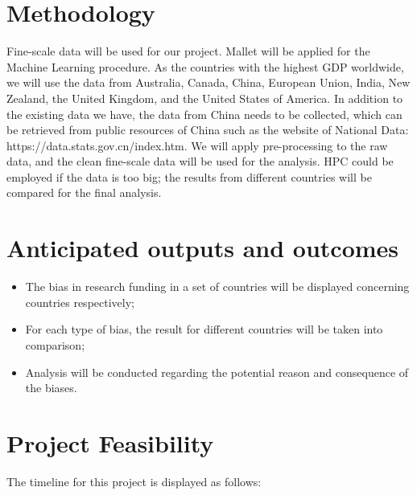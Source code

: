 \documentclass[11pt, oneside]{article}   	%
\begin{document}
\section{Methodology}
Fine-scale data will be used for our project. Mallet will be applied for the Machine Learning procedure. As the countries with the highest GDP worldwide, we will use the data from Australia, Canada, China, European Union, India, New Zealand, the United Kingdom, and the United States of America. In addition to the existing data we have, the data from China needs to be collected, which can be retrieved from public resources of China such as the website of National Data: https://data.stats.gov.cn/index.htm. 
We will apply pre-processing to the raw data, and the clean fine-scale data will be used for the analysis. HPC could be employed if the data is too big; the results from different countries will be compared for the final analysis.

\section{Anticipated outputs and outcomes}

\begin{itemize}
\item The bias in research funding in a set of countries will be displayed concerning countries respectively;
\item For each type of bias, the result for different countries will be taken into comparison;
\item Analysis will be conducted regarding the potential reason and consequence of the biases.

\end{itemize}

\section{Project Feasibility}

The timeline for this project is displayed as follows:
\end{document}
